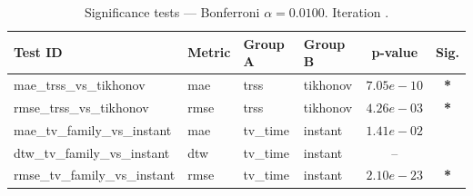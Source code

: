 ﻿%
\begin{table}[ht]
\centering
\caption[EEG reconstruction - Iteration it09]{Significance tests — Bonferroni $\alpha=0.0100$. Iteration .}
\label{tab:sig_it09_tikhonov_rbfi_focus}
\small
\begin{tabular}{llllcc}
\toprule
Test ID & Metric & Group A & Group B & p-value & Sig. \\
\midrule
mae\_trss\_vs\_tikhonov & mae & trss & tikhonov & $7.05e-10$ & \textbf{*} \\
rmse\_trss\_vs\_tikhonov & rmse & trss & tikhonov & $4.26e-03$ & \textbf{*} \\
mae\_tv\_family\_vs\_instant & mae & tv\_time & instant & $1.41e-02$ &  \\
dtw\_tv\_family\_vs\_instant & dtw & tv\_time & instant & -- &  \\
rmse\_tv\_family\_vs\_instant & rmse & tv\_time & instant & $2.10e-23$ & \textbf{*} \\
\bottomrule
\end{tabular}
\end{table}







